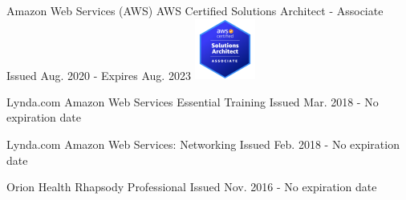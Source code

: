 \begin{cventries}

\cventry
{Amazon Web Services (AWS)\vspace{2mm}} %
{AWS Certified Solutions Architect - Associate} %
{} %
{Issued Aug. 2020 - Expires Aug. 2023} %
{ %
\includegraphics[height=2cm]{aws}
}


\cventry
{Lynda.com} %
{Amazon Web Services Essential Training} %
{} %
{Issued Mar. 2018 - No expiration date} %
{ %
}


\cventry
{Lynda.com} %
{Amazon Web Services: Networking} %
{} %
{Issued Feb. 2018 - No expiration date} %
{ %
}


\cventry
{Orion Health} %
{Rhapsody Professional} %
{} %
{Issued Nov. 2016 - No expiration date} %
{ %
}


\end{cventries}
